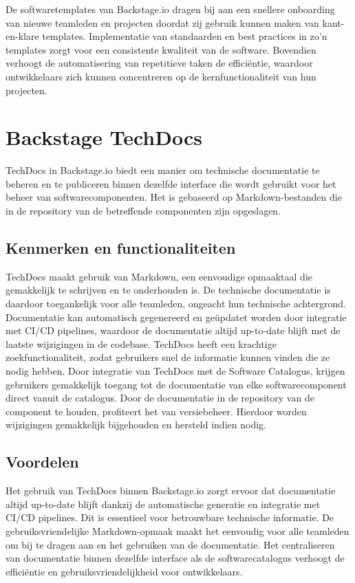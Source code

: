 De softwaretemplates van Backstage.io dragen bij aan een snellere onboarding van nieuwe teamleden en projecten doordat zij gebruik kunnen maken van kant-en-klare templates. Implementatie van standaarden en best practices in zo'n templates zorgt voor een consistente kwaliteit van de software. Bovendien verhoogt de automatisering van repetitieve taken de efficiëntie, waardoor ontwikkelaars zich kunnen concentreren op de kernfunctionaliteit van hun projecten.

\section{Backstage TechDocs}

TechDocs in Backstage.io biedt een manier om technische documentatie te beheren en te publiceren binnen dezelfde interface die wordt gebruikt voor het beheer van softwarecomponenten. Het is gebaseerd op Markdown-bestanden die in de repository van de betreffende componenten zijn opgeslagen.

\subsection{Kenmerken en functionaliteiten}

TechDocs maakt gebruik van Markdown, een eenvoudige opmaaktaal die gemakkelijk te schrijven en te onderhouden is. De technische documentatie is daardoor toegankelijk voor alle teamleden, ongeacht hun technische achtergrond. Documentatie kan automatisch gegenereerd en geüpdatet worden door integratie met CI/CD pipelines, waardoor de documentatie altijd up-to-date blijft met de laatste wijzigingen in de codebase. TechDocs heeft een krachtige zoekfunctionaliteit, zodat gebruikers snel de informatie kunnen vinden die ze nodig hebben. Door integratie van TechDocs met de Software Catalogus, krijgen gebruikers gemakkelijk toegang tot de documentatie van elke softwarecomponent direct vanuit de catalogus. Door de documentatie in de repository van de component te houden, profiteert het van versiebeheer. Hierdoor worden wijzigingen gemakkelijk bijgehouden en hersteld indien nodig.

\subsection{Voordelen}

Het gebruik van TechDocs binnen Backstage.io zorgt ervoor dat documentatie altijd up-to-date blijft dankzij de automatische generatie en integratie met CI/CD pipelines. Dit is essentieel voor betrouwbare technische informatie. De gebruiksvriendelijke Markdown-opmaak maakt het eenvoudig voor alle teamleden om bij te dragen aan en het gebruiken van de documentatie. Het centraliseren van documentatie binnen dezelfde interface als de softwarecatalogus verhoogt de efficiëntie en gebruiksvriendelijkheid voor ontwikkelaars.

